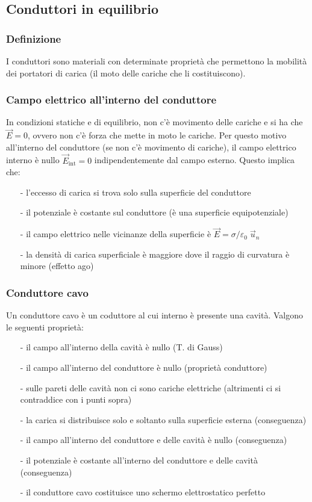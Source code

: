 \documentclass[a4paper]{article}
\newcommand\un{\vec{u}_n}
\begin{document}
\newpage

\subsection{Conduttori in equilibrio}
\subsubsection*{Definizione}
I conduttori sono materiali con determinate proprietà che permettono la mobilità dei portatori di carica (il moto delle cariche
che li costituiscono).

\subsubsection*{Campo elettrico all'interno del conduttore}
In condizioni statiche e di equilibrio, non c'è movimento delle cariche e si ha che \(\vec{E} = 0\), ovvero non c'è forza che
mette in moto le cariche. Per questo motivo all'interno del conduttore (se non c'è movimento di cariche), il campo elettrico
interno è nullo \(\vec{E}_\text{int} = 0\) indipendentemente dal campo esterno. Questo implica che:
\begin{itemize}[topsep=3pt, itemsep=0pt]
	\item[-] l'eccesso di carica si trova solo sulla superficie del conduttore
	\item[-] il potenziale è costante sul conduttore (è una superficie equipotenziale)
	\item[-] il campo elettrico nelle vicinanze della superficie è \(\vec{E} = \sigma / \varepsilon_0 \; \un\)
	\item[-] la densità di carica superficiale è maggiore dove il raggio di curvatura è minore (effetto ago)
\end{itemize}

\subsubsection*{Conduttore cavo}
Un conduttore cavo è un coduttore al cui interno è presente una cavità. Valgono le seguenti proprietà:
\begin{itemize}[topsep=3pt, itemsep=0pt]
	\item[-] il campo all'interno della cavità è nullo (T. di Gauss)
	\item[-] il campo all'interno del conduttore è nullo (proprietà conduttore)
	\item[-] sulle pareti delle cavità non ci sono cariche elettriche (altrimenti ci si contraddice con i punti sopra)
	\item[-] la carica si distribuisce solo e soltanto sulla superficie esterna (conseguenza)
	\item[-] il campo all'interno del conduttore e delle cavità è nullo (conseguenza)
	\item[-] il potenziale è costante all'interno del conduttore e delle cavità (conseguenza)
	\item[-] il conduttore cavo costituisce uno schermo elettrostatico perfetto
\end{itemize}
\end{document}

